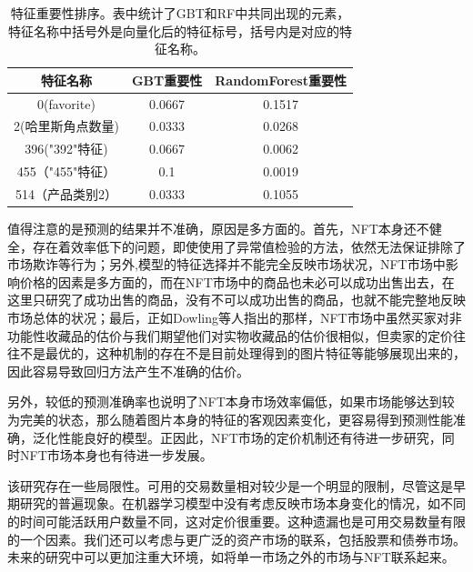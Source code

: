 \documentclass{article}
\begin{document}
\begin{table}[!htpb]
	\centering
	\begin{tabular}{c|cc}
		\hline 
		特征名称  & GBT重要性 & RandomForest重要性\\\hline
		0(favorite) &  0.0667 & 0.1517 \\
		2(哈里斯角点数量) & 0.0333 & 0.0268 \\
		396("392"特征) & 0.0667 & 0.0062  \\
		455（"455"特征） & 0.1 & 0.0019\\
		514（产品类别2） & 0.0333& 0.1055 \\\hline 
	\end{tabular}
	\caption{特征重要性排序。表中统计了GBT和RF中共同出现的元素，特征名称中括号外是向量化后的特征标号，括号内是对应的特征名称。}
	\label{tab:特征重要性}
\end{table}

\par 值得注意的是预测的结果并不准确，原因是多方面的。首先，NFT本身还不健全，存在着效率低下的问题\cite{Dowling2022Jan}，即使使用了异常值检验的方法，依然无法保证排除了市场欺诈等行为；另外,模型的特征选择并不能完全反映市场状况，NFT市场中影响价格的因素是多方面的，而在NFT市场中的商品也未必可以成功出售出去，在这里只研究了成功出售的商品，没有不可以成功出售的商品，也就不能完整地反映市场总体的状况；最后，正如Dowling等人指出的那样，NFT市场中\cite{两页NFT价格预测}虽然买家对非功能性收藏品的估价与我们期望他们对实物收藏品的估价很相似，但卖家的定价往往不是最优的，这种机制的存在不是目前处理得到的图片特征等能够展现出来的，因此容易导致回归方法产生不准确的估价。
\par 另外，较低的预测准确率也说明了NFT本身市场效率偏低，如果市场能够达到较为完美的状态，那么随着图片本身的特征的客观因素变化，更容易得到预测性能准确，泛化性能良好的模型。正因此，NFT市场的定价机制还有待进一步研究，同时NFT市场本身也有待进一步发展。
\par 该研究存在一些局限性。可用的交易数量相对较少是一个明显的限制，尽管这是早期研究的普遍现象。在机器学习模型中没有考虑反映市场本身变化的情况，如不同的时间可能活跃用户数量不同，这对定价很重要。这种遗漏也是可用交易数量有限的一个因素。我们还可以考虑与更广泛的资产市场的联系，包括股票和债券市场。未来的研究中可以更加注重大环境，如将单一市场之外的市场与NFT联系起来。



\newpage


\end{document}
